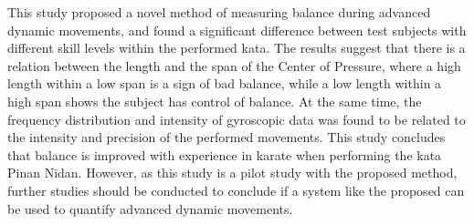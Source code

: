 



This study proposed a novel method of measuring balance during advanced dynamic movements, and found a significant difference between test subjects with different skill levels within the performed kata. The results suggest that there is a relation between the length and the span of the Center of Pressure, where a high length within a low span is a sign of bad balance, while a low length within a high span shows the subject has control of balance. At the same time, the frequency distribution and intensity of gyroscopic data was found to be related to the intensity and precision of the performed movements. This study concludes that balance is improved with experience in karate when performing the kata Pinan Nidan. However, as this study is a pilot study with the proposed method, further studies should be conducted to conclude if a system like the proposed can be used to quantify advanced dynamic movements.

\vspace{2cm}